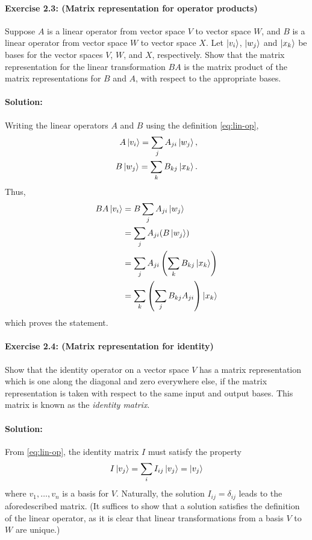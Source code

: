 \paragraph{\cite{mikeandike} Exercise 2.3: (Matrix representation for operator
products)} Suppose $A$ is a linear operator from vector space $V$ to vector
space $W$, and $B$ is a linear operator from vector space $W$ to vector space
$X$. Let $\ket{v_i}$, $\ket{w_j}$ and $\ket{x_k}$ be bases for the vector
spaces $V$, $W$, and $X$, respectively. Show that the matrix representation for
the linear transformation $BA$ is the matrix product of the matrix
representations for $B$ and $A$, with respect to the appropriate bases.

\paragraph{Solution:} Writing the linear operators $A$ and $B$ using the
definition \eqref{eq:lin-op}, \begin{equation*}
  \begin{split}
    A\ket{v_i} = \sum_j A_{ji}\ket{w_j}, \\
    B\ket{w_j} = \sum_k B_{kj}\ket{x_k}.
  \end{split}
\end{equation*} Thus, \begin{align*}
  BA\ket{v_i}
  &= B \sum_j A_{ji}\ket{w_j} \\
  &= \sum_j A_{ji} (B\ket{w_j}) \\
  &= \sum_j A_{ji} \left(\sum_k B_{kj} \ket{x_k}\right) \\
  &= \sum_k \left(\sum_j B_{kj}A_{ji}\right) \ket{x_k} 
\end{align*} which proves the statement.

\paragraph{\cite{mikeandike} Exercise 2.4: (Matrix representation for
identity)} Show that the identity operator on a vector space $V$ has a matrix
representation which is one along the diagonal and zero everywhere else, if the
matrix representation is taken with respect to the same input and output bases.
This matrix is known as the \emph{identity matrix}.

\paragraph{Solution:} From \eqref{eq:lin-op}, the identity matrix $I$ must
satisfy the property \begin{equation*}
  I\ket{v_j} = \sum_i I_{ij}\ket{v_j} = \ket{v_j}
\end{equation*} where $v_1, \ldots, v_n$ is a basis for $V$. Naturally, the
solution $I_{ij} = \delta_{ij}$ leads to the aforedescribed matrix. (It
suffices to show that a solution satisfies the definition of the linear
operator, as it is clear that linear transformations from a basis $V$ to $W$
are unique.)

